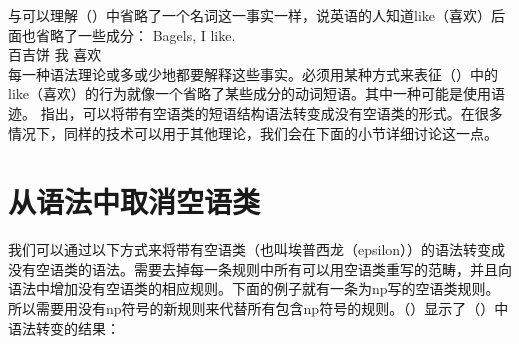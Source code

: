 与可以理解（）中省略了一个名词这一事实一样，说英语的人知道like（喜欢）后面也省略了一些成分：
\ea
\gll Bagels, I like.\\
	 百吉饼 我 喜欢\\
\z
每一种语法理论或多或少地都要解释这些事实。必须用某种方式来表征（）中的like（喜欢）的行为就像一个省略了某些成分的动词短语。其中一种可能是使用语迹。 \citet*[, \S~4.1]{BHPS61a}指出，可以将带有空语类的短语结构语法转变成没有空语类的形式。在很多情况下，同样的技术可以用于其他理论，我们会在下面的小节详细讨论这一点。

\section{从语法中取消空语类}
\label{Abschnitt-Eleminierung-leerer-Elemente}

我们可以通过以下方式来将带有空语类（也叫埃普西龙（epsilon））的语法转变成没有空语类的语法。需要去掉每一条规则中所有可以用空语类重写的范畴，并且向语法中增加没有空语类的相应规则。下面的例子就有一条为np写的空语类规则。所以需要用没有np符号的新规则来代替所有包含np符号的规则。（）显示了（）中语法转变的结果：

